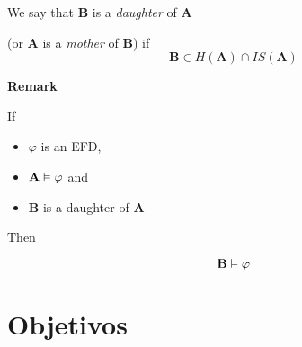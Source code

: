 \documentclass[12pt]{beamer}
\newenvironment{stepitemize}{\begin{itemize}[<+->]}{\end{itemize} }
\begin{document}
\begin{frame}
 \begin{definition}
  We say that $\mathbf{B}$ is a \textit{daughter} of $\mathbf{A}$ 

(or $\mathbf{A}$ is a \textit{mother} of $\mathbf{B}$) if 
\[ \mathbf{B} \in H(\mathbf{A}) \cap IS(\mathbf{A}) \]

 \end{definition}

\textbf{Remark} 

If 

\begin{stepitemize}
 \item $\varphi$ is an EFD,
 \item $\mathbf{A} \vDash \varphi$ and 
 \item $\mathbf{B}$ is a daughter of $\mathbf{A}$
\end{stepitemize}

\pause

Then

\[ \mathbf{B} \vDash \varphi \]


\end{frame}


\section{Objetivos}
\begin{frame} 
\end{frame}
\end{document}
